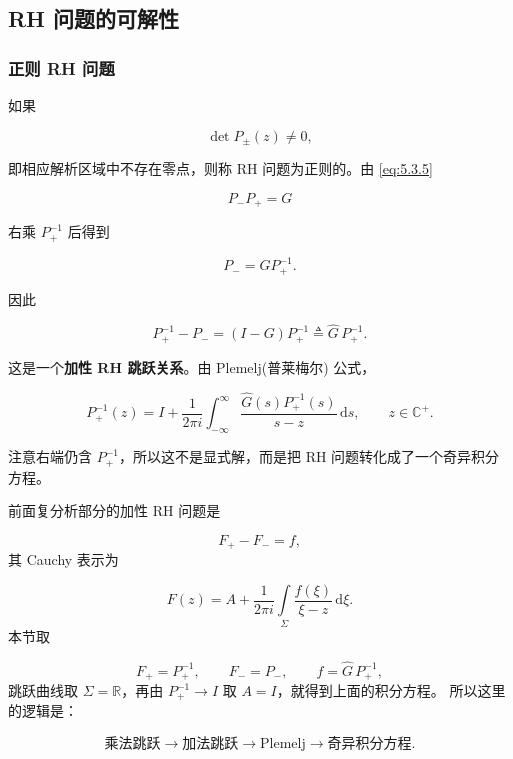 \documentclass[
    lang=cn,
    scheme=chinese,
    mode=simple,
    device=normal,
    color=blue,
    math=cm,
    thmcnt=section,
    12pt
]{elegantbook}
\begin{document}
\subsection{RH 问题的可解性}

\subsubsection{正则 RH 问题}

如果

\begin{equation}
    \det P_\pm(z)\ne0,
    \tag{5.3.10}
    \label{eq:5.3.10}
\end{equation}

即相应解析区域中不存在零点，则称 RH 问题为正则的。由 \eqref{eq:5.3.5}

\[
    P_-P_+=G
\]

右乘 $P_+^{-1}$ 后得到

\[
    P_-=GP_+^{-1}.
\]

因此

\[
    P_+^{-1}-P_-
    =
    (I-G)P_+^{-1}
    \triangleq
    \widehat G\,P_+^{-1}.
\]

这是一个\textbf{加性 RH 跳跃关系}。由 Plemelj(普莱梅尔) 公式，

\[
    P_+^{-1}(z)
    =
    I+
    \dfrac{1}{2\pi i}
    \int_{-\infty}^{\infty}
    \dfrac{\widehat G(s)P_+^{-1}(s)}{s-z}\,\mathrm ds,
    \qquad
    z\in\mathbb{C}^+.
\]

注意右端仍含 $P_+^{-1}$，所以这不是显式解，而是把 RH 问题转化成了一个奇异积分方程。

\begin{callout}
    前面复分析部分的加性 RH 问题是

    \[
        F_+-F_-=f,
    \]
    其 Cauchy 表示为

    \[
        F(z)
        =
        A+
        \dfrac{1}{2\pi i}
        \int\limits_\Sigma
        \dfrac{f(\xi)}{\xi-z}\,\mathrm d\xi.
    \]
    本节取

    \[
        F_+=P_+^{-1},
        \qquad
        F_-=P_-,
        \qquad
        f=\widehat G\,P_+^{-1},
    \]
    跳跃曲线取 $\Sigma=\mathbb{R}$，再由 $P_+^{-1}\to I$ 取 $A=I$，就得到上面的积分方程。
    所以这里的逻辑是：

    \[
        \text{乘法跳跃}
        \longrightarrow
        \text{加法跳跃}
        \longrightarrow
        \text{Plemelj}
        \longrightarrow
        \text{奇异积分方程}.
    \]

\end{callout}
\end{document}
